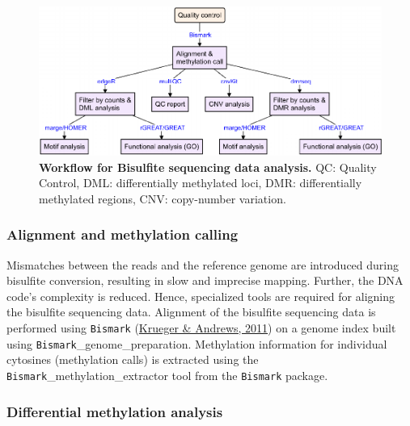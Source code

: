 \documentclass[12pt,twoside]{reedthesis}
\begin{document}
\begin{figure}[htbp]

{\centering \includegraphics{thesis_files/figure-latex/mf7-1} 

}

\caption[Workflow for Bisulfite sequencing data analysis]{\textbf{Workflow for Bisulfite sequencing data analysis.} QC:
Quality Control, DML: differentially methylated loci, DMR:
differentially methylated regions, CNV: copy-number variation.}\label{fig:mf7}
\end{figure}
\hypertarget{m3.5.1}{%
\subsubsection*{Alignment and methylation calling}\label{m3.5.1}}

Mismatches between the reads and the reference genome are introduced
during bisulfite conversion, resulting in slow and imprecise mapping.
Further, the DNA code's complexity is reduced. Hence, specialized tools
are required for aligning the bisulfite sequencing data. Alignment of
the bisulfite sequencing data is performed using \texttt{Bismark}
(\protect\hyperlink{ref-krueger2011}{Krueger \& Andrews, 2011}) on a genome index built using
\texttt{Bismark}\_genome\_preparation. Methylation information for individual
cytosines (methylation calls) is extracted using the
\texttt{Bismark}\_methylation\_extractor tool from the \texttt{Bismark} package.

\hypertarget{m3.5.2}{%
\subsubsection*{Differential methylation analysis}\label{m3.5.2}}
\end{document}
